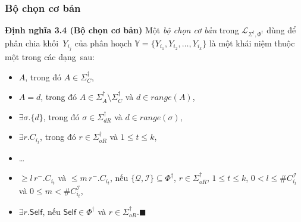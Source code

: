 \documentclass[notheorems,xcolor=dvipsnames]{beamer}
\newcommand{\mL}		{\mathcal{L}}
\newcommand{\mI}		{\mathcal{I}}
\newcommand{\mO}		{\mathcal{O}}
\newcommand{\mN}		{\mathcal{N}}
\newcommand{\mQ}		{\mathcal{Q}}
\newcommand{\mF}		{\mathcal{F}}
\newcommand{\mbY}		{\mathbb{Y}}
\newcommand{\SigmaDagI}	{\Sigma^\dag_I}
\newcommand{\SigmaDagA}	{\Sigma^\dag_A}
\newcommand{\SigmaDagC}	{\Sigma^\dag_C}
\newcommand{\SigmaDagOR}{\Sigma^\dag_{oR}}
\newcommand{\SigmaDagDR}{\Sigma^\dag_{dR}}
\newcommand{\Self}		{\mathsf{Self}}
\newcommand{\mLSPD}		{\mL_{\Sigma^\dag,\Phi^\dag}}
\newcommand{\myend}		{\mbox{}\hfill\mbox{{\tiny$\!\blacksquare$}}}
\newcommand{\E}			{\exists}
\newcommand{\Range}		{\mathit{range}}
\begin{document}
\begin{frame}\frametitle{\bf Bộ chọn cơ bản}
	\begin{block}{\bf Định nghĩa 3.4 (Bộ chọn cơ bản)}
		\label{def:BasicSelectors}
		Một {\em bộ chọn cơ bản} trong $\mLSPD$ dùng để phân chia khối~$Y_{i_j}$ của phân hoạch $\mbY = \{Y_{i_1}, Y_{i_2}, \ldots, Y_{i_k}\}$ là một khái niệm thuộc một trong các dạng~sau:
		\begin{itemize}
			\item $A$, trong đó $A \in \SigmaDagC$,
			\item $A=d$, trong đó $A \in \SigmaDagA\setminus\SigmaDagC$ và $d \in \Range(A)$,
			\item $\E \sigma.\{d\}$, trong đó $\sigma \in \SigmaDagDR$ và $d \in \Range(\sigma)$,
			\item $\E r.C_{i_t}$, trong đó $r \in \SigmaDagOR$ và $1 \leq t \leq k$,
			\item \ldots		
			\item $\geq\!l\,r^-.C_{i_t}$ và $\leq\!m\,r^-.C_{i_t}$, nếu $\{\mQ, \mI\} \subseteq \Phi^\dag$, $r \in \SigmaDagOR$, $1 \leq t \leq k$, $0 < l \leq \#C_{i_t}^\mI$ và $0 \leq m < \#C_{i_t}^\mI$,
			\item $\E r.\Self$, nếu $\Self \in \Phi^\dag$ và $r \in \SigmaDagOR$.\myend
		\end{itemize}
	\end{block}
\end{frame}
\end{document}
